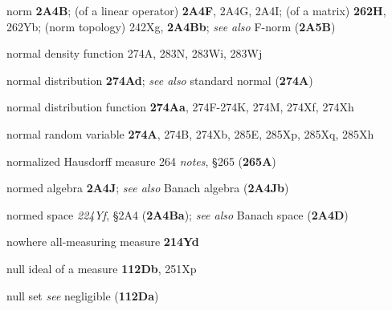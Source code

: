 norm {\bf 2A4B};
  (of a linear operator) {\bf 2A4F}, 2A4G, 2A4I;
  (of a matrix) {\bf 262H}, 262Yb;
  (norm topology) 242Xg, {\bf 2A4Bb};
  {\it see also}
    F-norm ({\bf 2A5B})


normal density function 274A, 283N, 283Wi, 283Wj


normal distribution {\bf 274Ad};
{\it see also} standard normal ({\bf 274A})


normal distribution function {\bf 274Aa},
274F-274K, 
274M, 274Xf, 274Xh












normal random variable {\bf 274A}, 274B, 274Xb,
285E, 285Xp, 285Xq, 285Xh


















normalized Hausdorff measure 264 {\it notes},
\S265 ({\bf 265A})




normed algebra {\bf 2A4J};  
  {\it see also} Banach algebra ({\bf 2A4Jb})


normed space {\it 224Yf}, \S2A4 ({\bf 2A4Ba}); 
  {\it see also} Banach space ({\bf 2A4D})












nowhere all-measuring measure {\bf 214Yd}
















null ideal of a measure {\bf 112Db},
  251Xp




null set {\it see} negligible ({\bf 112Da})


\indexmedskip

